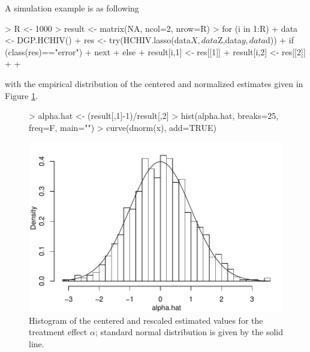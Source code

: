 \documentclass{amsart}
\begin{document}
A simulation example is as following

\begin{Schunk}
\begin{Sinput}
> R <- 1000
> result <- matrix(NA, ncol=2, nrow=R)
> for (i in 1:R) {
+   data <- DGP.HCHIV()
+   res <- try(HCHIV.lasso(data$X,data$Z,data$y,data$d))
+   if (class(res)=="error") {
+     next
+   } else {
+   result[i,1] <- res[[1]]
+   result[i,2] <- res[[2]]
+   }
+ }
\end{Sinput}
\end{Schunk}
with the empirical distribution of the centered and normalized estimates given in Figure \ref{HCIV}.
\begin{figure}[h!]
\begin{center}
\label{HCIV}
\begin{Schunk}
\begin{Sinput}
> alpha.hat <- (result[,1]-1)/result[,2]
> hist(alpha.hat, breaks=25, freq=F, main="")
> curve(dnorm(x), add=TRUE)
\end{Sinput}
\end{Schunk}
\includegraphics{HDM-HCHIV}
\end{center}
\caption{Histogram of the centered and rescaled estimated values for the treatment effect $\alpha$; standard normal distribution is given by the solid line.}
\end{figure}
\end{document}
